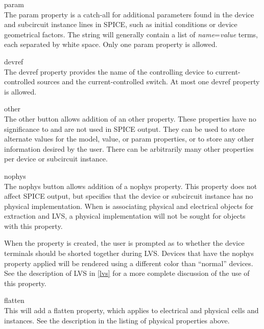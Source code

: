 \begin{description}
\item{\cb param}\\
The {\et param} property is a catch-all for additional parameters
found in the device and subcircuit instance lines in SPICE, such as
initial conditions or device geometrical factors.  The string will
generally contain a list of {\it name\/}{\vt =}{\it value} terms, each
separated by white space.  Only one {\et param} property is allowed.

\item{\cb devref}\\
The {\et devref} property provides the name of the controlling device
to current-controlled sources and the current-controlled switch.  At
most one {\et devref} property is allowed.

\item{\cb other}\\
The {\cb other} button allows addition of an {\et other} property. 
These properties have no significance to {\Xic} and are not used in
SPICE output.  They can be used to store alternate values for the {\et
model}, {\et value}, or {\et param} properties, or to store any other
information desired by the user.  There can be arbitrarily many
{\et other} properties per device or subcircuit instance.

\item{\cb nophys}\\
The {\cb nophys} button allows addition of a {\et nophys} property. 
This property does not affect SPICE output, but specifies that the
device or subcircuit instance has no physical implementation.  When
{\Xic} is associating physical and electrical objects for extraction
and LVS, a physical implementation will not be sought for objects with
this property.

When the property is created, the user is prompted as to whether the
device terminals should be shorted together during LVS.  Devices that
have the {\et nophys} property applied will be rendered using a
different color than ``normal'' devices.  See the description of LVS
in \ref{lvs} for a more complete discussion of the use of this
property.

\item{\cb flatten}\\
This will add a {\et flatten} property, which applies to electrical
and physical cells and instances.  See the description in the listing
of physical properties above.


\end{description}
